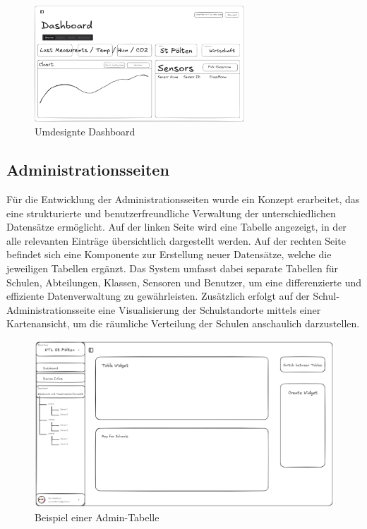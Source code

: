 \begin{inhalt}
\begin{figure}[!htb] 
\centering 
\includegraphics[width=0.7\textwidth]{files/Thomas/pics/Design-Grundlagen/Frontend/Dashboard/Dashboard-Draw.png} 
\caption[Bildbezeichnung für Abbildungsverzeichnis]{Umdesignte Dashboard} 
\label{fig:gehaeuse_internet_bild} 
\end{figure}

\newpage

\subsection{Administrationsseiten}
\label{ref:Administrationsseiten}

Für die Entwicklung der Administrationsseiten wurde ein Konzept erarbeitet, das eine strukturierte und benutzerfreundliche Verwaltung der unterschiedlichen Datensätze ermöglicht. Auf der linken Seite wird eine Tabelle angezeigt, in der alle relevanten Einträge übersichtlich dargestellt werden. Auf der rechten Seite befindet sich eine Komponente zur Erstellung neuer Datensätze, welche die jeweiligen Tabellen ergänzt. Das System umfasst dabei separate Tabellen für Schulen, Abteilungen, Klassen, Sensoren und Benutzer, um eine differenzierte und effiziente Datenverwaltung zu gewährleisten. Zusätzlich erfolgt auf der Schul-Administrationsseite eine Visualisierung der Schulstandorte mittels einer Kartenansicht, um die räumliche Verteilung der Schulen anschaulich darzustellen.


\begin{figure}[!htb] 
\centering 
\includegraphics[width=1\textwidth]{files/Thomas/pics/Design-Grundlagen/Frontend/AdminSeite/AdminSeite-Draw.png} 
\caption[Bildbezeichnung für Abbildungsverzeichnis]{Beispiel einer Admin-Tabelle} 
\label{fig:gehaeuse_internet_bild} 
\end{figure}


\end{inhalt}
